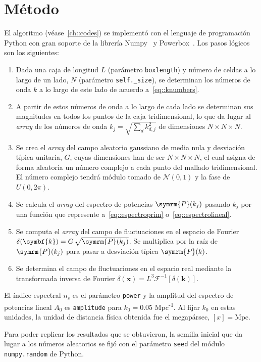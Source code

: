 \section{Método}
El algoritmo (véase~\autoref{ch::codes}) se implementó con el lenguaje de programación Python con gran soporte de la librería Numpy~\cite{harris2020array} y Powerbox~\cite{Murray2018}. Los pasos lógicos son los siguientes:
\begin{enumerate}
    \item Dada una caja de longitud \(L\) (parámetro \texttt{boxlength}) y número de celdas a lo largo de un lado, \(N\) (parámetro \texttt{self.\_size}), se determinan los números de onda \(k\) a lo largo de este lado de acuerdo a~\eqref{eq::knumbers}.
    \item A partir de estos números de onda a lo largo de cada lado se determinan sus magnitudes en todos los puntos de la caja tridimensional, lo que da lugar al \textit{array} de los números de onda \(k_j=\sqrt{\sum_d k^2_{d,j}}\) de dimensiones \(N\times N\times N\).
    \item Se crea el \textit{array} del campo aleatorio gaussiano de media nula y desviación típica unitaria, \(G\), cuyas dimensiones han de ser \(N\times N\times N\), el cual asigna de forma aleatoria un número complejo a cada punto del mallado tridimensional. El número complejo tendrá módulo tomado de \(\mathcal{N}(0,1)\) y la fase de \(U(0,2\pi)\).
    \item Se calcula el \textit{array} del espectro de potencias \(\symrm{P}(k_j)\) pasando \(k_j\) por una función que represente a~\eqref{eq::espectroprim} o~\eqref{eq::espectrolineal}.
    \item Se computa el \textit{array} del campo de fluctuaciones en el espacio de Fourier \(\delta(\symbf{k})=G\,\sqrt{\symrm{P}(k_j)}\). Se multiplica por la raíz de \(\symrm{P}(k_j)\) para pasar a desviación típica \(\symrm{P}(k)\).
    \item Se determina el campo de fluctuaciones en el espacio real mediante la transformada inversa de Fourier \(\delta(\symbf{x})=L^3\mathcal{F}^{-1}\left[\delta(\symbf{k})\right]\).
\end{enumerate}
El índice espectral \(n_s\) es el parámetro \texttt{power} y la amplitud del espectro de potencias lineal \(A_0\) es \texttt{amplitude} para \(k_0=0.05\) Mpc\textsuperscript{-1}. Al fijar \(k_0\) en estas unidades, la unidad de distancia física obtenida fue el megapársec, \([x]=\text{Mpc}\).

Para poder replicar los resultados que se obtuvieron, la semilla inicial que da lugar a los números aleatorios se fijó con el parámetro \texttt{seed} del módulo \texttt{numpy.random} de Python.
